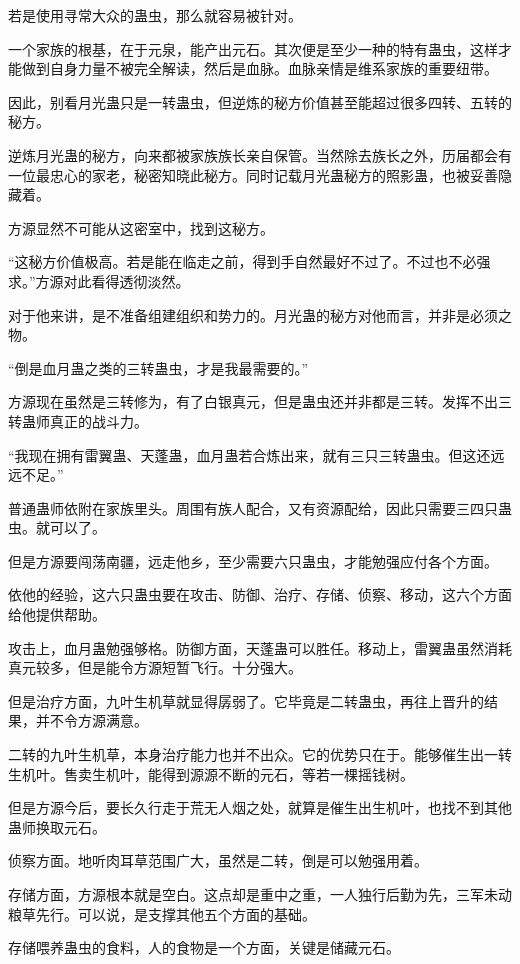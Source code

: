 \begin{this_body}
若是使用寻常大众的蛊虫，那么就容易被针对。

一个家族的根基，在于元泉，能产出元石。其次便是至少一种的特有蛊虫，这样才能做到自身力量不被完全解读，然后是血脉。血脉亲情是维系家族的重要纽带。

因此，别看月光蛊只是一转蛊虫，但逆炼的秘方价值甚至能超过很多四转、五转的秘方。

逆炼月光蛊的秘方，向来都被家族族长亲自保管。当然除去族长之外，历届都会有一位最忠心的家老，秘密知晓此秘方。同时记载月光蛊秘方的照影蛊，也被妥善隐藏着。

方源显然不可能从这密室中，找到这秘方。

“这秘方价值极高。若是能在临走之前，得到手自然最好不过了。不过也不必强求。”方源对此看得透彻淡然。

对于他来讲，是不准备组建组织和势力的。月光蛊的秘方对他而言，并非是必须之物。

“倒是血月蛊之类的三转蛊虫，才是我最需要的。”

方源现在虽然是三转修为，有了白银真元，但是蛊虫还并非都是三转。发挥不出三转蛊师真正的战斗力。

“我现在拥有雷翼蛊、天蓬蛊，血月蛊若合炼出来，就有三只三转蛊虫。但这还远远不足。”

普通蛊师依附在家族里头。周围有族人配合，又有资源配给，因此只需要三四只蛊虫。就可以了。

但是方源要闯荡南疆，远走他乡，至少需要六只蛊虫，才能勉强应付各个方面。

依他的经验，这六只蛊虫要在攻击、防御、治疗、存储、侦察、移动，这六个方面给他提供帮助。

攻击上，血月蛊勉强够格。防御方面，天蓬蛊可以胜任。移动上，雷翼蛊虽然消耗真元较多，但是能令方源短暂飞行。十分强大。

但是治疗方面，九叶生机草就显得孱弱了。它毕竟是二转蛊虫，再往上晋升的结果，并不令方源满意。

二转的九叶生机草，本身治疗能力也并不出众。它的优势只在于。能够催生出一转生机叶。售卖生机叶，能得到源源不断的元石，等若一棵摇钱树。

但是方源今后，要长久行走于荒无人烟之处，就算是催生出生机叶，也找不到其他蛊师换取元石。

侦察方面。地听肉耳草范围广大，虽然是二转，倒是可以勉强用着。

存储方面，方源根本就是空白。这点却是重中之重，一人独行后勤为先，三军未动粮草先行。可以说，是支撑其他五个方面的基础。

存储喂养蛊虫的食料，人的食物是一个方面，关键是储藏元石。


\end{this_body}
